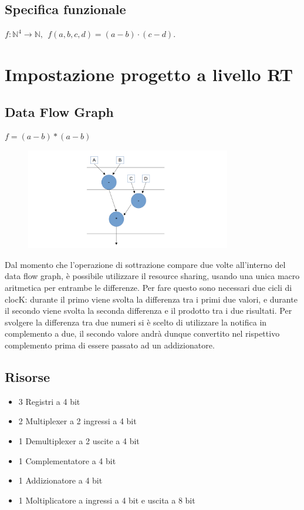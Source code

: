 \documentclass[10pt]{article}
\begin{document}
\subsection{Specifica funzionale}
$f:{\mathbb{N}^4} \longrightarrow \mathbb{N}, \ \ f(a,b,c,d) = (a-b)\cdot (c-d)$.
\newpage

\section{Impostazione progetto a livello RT}

\subsection{Data Flow Graph}
$f = (a-b) * (a-b)$
\begin{figure}[H]
    \centering
    \includegraphics[width=0.8\textwidth]{dfg}
\end{figure}

Dal momento che l'operazione di sottrazione compare due volte all'interno del data flow graph, è possibile utilizzare il resource sharing, usando una unica macro aritmetica per entrambe le differenze.
Per fare questo sono necessari due cicli di clocK: durante il primo viene svolta la differenza tra i primi due valori, e durante il secondo viene svolta la seconda differenza e il prodotto tra i due
risultati. 
Per svolgere la differenza tra due numeri si è scelto di utilizzare la notifica in complemento a due, il secondo valore andrà dunque convertito nel rispettivo complemento prima di essere passato
ad un addizionatore.

\subsection{Risorse}
    \begin{itemize}
        \item 3 Registri a 4 bit
        \item 2 Multiplexer a 2 ingressi a 4 bit
        \item 1 Demultiplexer a 2 uscite a 4 bit
        \item 1 Complementatore a 4 bit
        \item 1 Addizionatore a 4 bit
        \item 1 Moltiplicatore a ingressi a 4 bit e uscita a 8 bit
    \end{itemize}
\newpage
\end{document}

